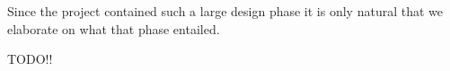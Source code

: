 Since the project contained such a large design phase it is only natural that we elaborate on what that phase entailed.

TODO!!
